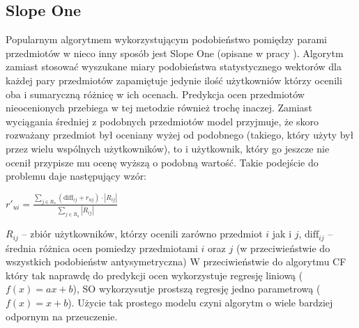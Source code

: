 \documentclass{pracamgr}
\begin{document}
   \subsection{Slope One}
    Popularnym algorytmem wykorzystującym podobieństwo pomiędzy parami przedmiotów w nieco inny sposób jest Slope One (opisane w pracy \cite{SO}).
    Algorytm zamiast stosować wyszukane miary podobieństwa statystycznego wektorów dla każdej pary przedmiotów zapamiętuje jedynie ilość
    użytkowniów którzy ocenili oba i sumaryczną różnicę w ich ocenach.\newline
    Predykcja ocen przedmiotów nieocenionych przebiega w tej metodzie również trochę inaczej.
    Zamiast wyciągania średniej z podobnych przedmiotów model przyjmuje,
    że skoro rozważany przedmiot był oceniany wyżej od podobnego (takiego, który użyty był przez wielu wspólnych użytkowników),
    to i użytkownik, który go jeszcze nie ocenił przypisze mu ocenę wyższą o podobną wartość.
    Takie podejście do problemu daje następujący wzór:\newline
    \begin{center}
     $r'_{ui}=\frac{\sum\limits_{j\in R_u}(\text{diff}_{ij}+r_{uj})\cdot|R_{ij}|}{\sum\limits_{j\in R_u}|R_{ij}|}$
    \end{center}
    {\scriptsize
     $R_{ij}$ -- zbiór użytkowników, którzy ocenili zarówno przedmiot $i$ jak i $j$,\newline
     $\text{diff}_{ij}$ -- średnia różnica ocen pomiedzy przedmiotami $i$ oraz $j$ (w przeciwieństwie do wszystkich podobieństw antysymetryczna)
    }\newline
    W przeciwieństwie do algorytmu CF który tak naprawdę do predykcji ocen wykorzystuje regresję liniową ($f(x)=ax+b$),
    SO wykorzysutje prostszą regresję jedno parametrową ($f(x)=x+b$). Użycie tak prostego modelu czyni algorytm o wiele bardziej odpornym na przeuczenie.
\end{document}
